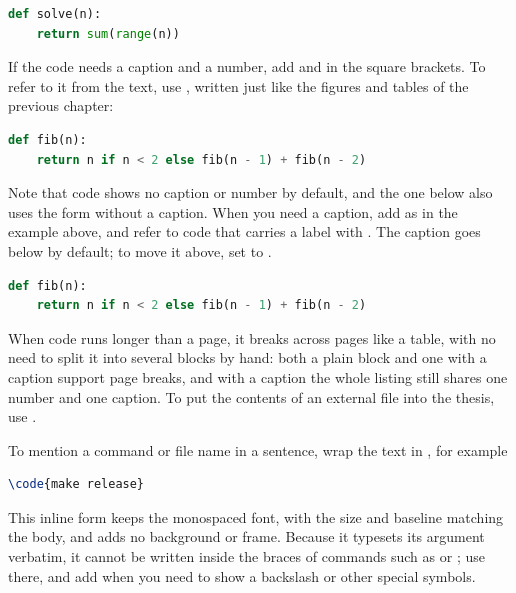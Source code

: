 \begin{codeblock}[language=latex]
\begin{lstlisting}[language=python]
def solve(n):
    return sum(range(n))
\end{lstlisting}
\end{codeblock}

If the code needs a caption and a number, add  and  in the square brackets. To refer to it from the text, use \code{\lstref}, written just like the figures and tables of the previous chapter:

\begin{codeblock}[language=latex]
\begin{lstlisting}[language=python,caption={Recursive version},label=lst:fib]
def fib(n):
    return n if n < 2 else fib(n - 1) + fib(n - 2)
\end{lstlisting}
\end{codeblock}

Note that code shows no caption or number by default, and the one below also uses the form without a caption. When you need a caption, add  as in the example above, and refer to code that carries a label with . The caption goes below by default; to move it above, set  to .

\begin{lstlisting}[language=python]
def fib(n):
    return n if n < 2 else fib(n - 1) + fib(n - 2)
\end{lstlisting}

When code runs longer than a page, it breaks across pages like a table, with no need to split it into several blocks by hand: both a plain  block and one with a caption support page breaks, and with a caption the whole listing still shares one number and one caption. To put the contents of an external file into the thesis, use \code{}.

To mention a command or file name in a sentence, wrap the text in \code{\code}, for example

\begin{lstlisting}[language=latex]
\code{make release}
\end{lstlisting}

This inline form keeps the monospaced font, with the size and baseline matching the body, and adds no background or frame. Because it typesets its argument verbatim, it cannot be written inside the braces of commands such as \code{\section} or \code{\caption}; use \code{\texttt} there, and add \code{\textbackslash} when you need to show a backslash or other special symbols.

